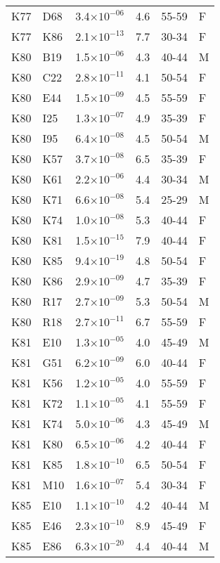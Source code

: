 \begin{longtable}{lllrll}
   K77 & D68 & 3.4$\times10^{-06}$ & 4.6 & 55-59 & F \\ 
   K77 & K86 & 2.1$\times10^{-13}$ & 7.7 & 30-34 & F \\ 
   K80 & B19 & 1.5$\times10^{-06}$ & 4.3 & 40-44 & M \\ 
   K80 & C22 & 2.8$\times10^{-11}$ & 4.1 & 50-54 & F \\ 
   K80 & E44 & 1.5$\times10^{-09}$ & 4.5 & 55-59 & F \\ 
   K80 & I25 & 1.3$\times10^{-07}$ & 4.9 & 35-39 & F \\ 
   K80 & I95 & 6.4$\times10^{-08}$ & 4.5 & 50-54 & M \\ 
   K80 & K57 & 3.7$\times10^{-08}$ & 6.5 & 35-39 & F \\ 
   K80 & K61 & 2.2$\times10^{-06}$ & 4.4 & 30-34 & M \\ 
   K80 & K71 & 6.6$\times10^{-08}$ & 5.4 & 25-29 & M \\ 
   K80 & K74 & 1.0$\times10^{-08}$ & 5.3 & 40-44 & F \\ 
   K80 & K81 & 1.5$\times10^{-15}$ & 7.9 & 40-44 & F \\ 
   K80 & K85 & 9.4$\times10^{-19}$ & 4.8 & 50-54 & F \\ 
   K80 & K86 & 2.9$\times10^{-09}$ & 4.7 & 35-39 & F \\ 
   K80 & R17 & 2.7$\times10^{-09}$ & 5.3 & 50-54 & M \\ 
   K80 & R18 & 2.7$\times10^{-11}$ & 6.7 & 55-59 & F \\ 
   K81 & E10 & 1.3$\times10^{-05}$ & 4.0 & 45-49 & M \\ 
   K81 & G51 & 6.2$\times10^{-09}$ & 6.0 & 40-44 & F \\ 
   K81 & K56 & 1.2$\times10^{-05}$ & 4.0 & 55-59 & F \\ 
   K81 & K72 & 1.1$\times10^{-05}$ & 4.1 & 55-59 & F \\ 
   K81 & K74 & 5.0$\times10^{-06}$ & 4.3 & 45-49 & M \\ 
   K81 & K80 & 6.5$\times10^{-06}$ & 4.2 & 40-44 & F \\ 
   K81 & K85 & 1.8$\times10^{-10}$ & 6.5 & 50-54 & F \\ 
   K81 & M10 & 1.6$\times10^{-07}$ & 5.4 & 30-34 & F \\ 
   K85 & E10 & 1.1$\times10^{-10}$ & 4.2 & 40-44 & M \\ 
   K85 & E46 & 2.3$\times10^{-10}$ & 8.9 & 45-49 & F \\ 
   K85 & E86 & 6.3$\times10^{-20}$ & 4.4 & 40-44 & M \\ 

\end{longtable}

